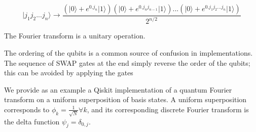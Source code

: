\documentclass{article}
\begin{document}
\begin{equation}
\lvert j_1 j_2 ... j_n \rangle \rightarrow \frac{ ( \lvert 0 \rangle + e^{0 . j_n} \lvert 1 \rangle ) ( \lvert 0 \rangle + e^{ 0 . j_n  j_{n-1}} \lvert 1 \rangle ) ... ( \lvert 0 \rangle + e^{ 0 . j_1 j_2 ... j_n} \lvert 1 \rangle ) }{2^{n/2}}
\label{eq:qft_product}
\end{equation}



The Fourier transform is a unitary operation.

The ordering of the qubits is a common source of confusion in implementations. The sequence of SWAP gates at the end simply reverse the order of the qubits; this can be avoided by applying the gates 

We provide as an example a Qiskit implementation of a quantum Fourier transform on a uniform superposition of basis states. A uniform superposition corresponds to $\phi_k = \frac{1}{\sqrt{N}} \forall k$, and its corresponding discrete Fourier transform is the delta function $\psi_j = \delta_{0,j}$.



\end{document}
